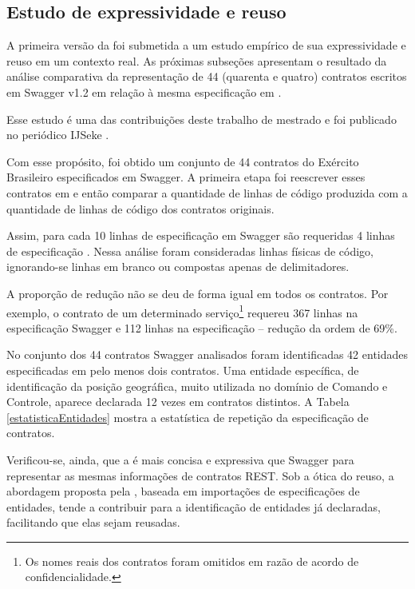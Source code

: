 \subsection{Estudo de expressividade e reuso}

A primeira versão da \neoidl{} foi submetida a um estudo empírico de sua expressividade 
e reuso em um contexto real. As próximas subseções apresentam 
o resultado da análise comparativa da representação de 44 (quarenta e quatro)
contratos escritos em Swagger v1.2 em relação à mesma especificação em
\neoidl{}.

Esse estudo é uma das contribuições deste trabalho de mestrado e foi publicado
no periódico IJSeke \cite{lima2015neoidl}.

Com esse propósito, foi obtido um conjunto de 44 contratos do Exército
Brasileiro especificados em Swagger. A primeira etapa foi reescrever esses
contratos em \neoidl{} e então comparar a quantidade de linhas de código
produzida com a quantidade de linhas de código dos contratos originais.

Assim, para
cada 10 linhas de especificação em Swagger são requeridas 4 linhas de
especificação \neoidl{}. Nessa análise foram consideradas linhas físicas de
código, ignorando-se linhas em branco ou compostas apenas de delimitadores.

A proporção de redução não se deu de forma igual em todos os contratos. Por
exemplo, o contrato de um determinado serviço\footnote{Os nomes reais dos
contratos foram omitidos em razão de acordo de confidencialidade.} requereu 367
linhas na especificação Swagger e 112 linhas na especificação \neoidl{} --
redução da ordem de 69\%.

No conjunto dos 44 contratos Swagger analisados foram identificadas 42 entidades
especificadas em pelo menos dois contratos. Uma entidade específica, de
identificação da posição geográfica, muito utilizada no domínio de Comando e Controle, aparece
declarada 12 vezes em contratos distintos. A Tabela \ref{estatisticaEntidades}
mostra a estatística de repetição da especificação de contratos.

Verificou-se,
ainda, que a \neoidl{} é mais concisa e expressiva que Swagger para representar
as mesmas informações de contratos REST. Sob a ótica do reuso, a abordagem proposta pela
\neoidl{}, baseada em importações de especificações de entidades, tende a
contribuir para a identificação de entidades já declaradas, facilitando que
elas sejam reusadas.


